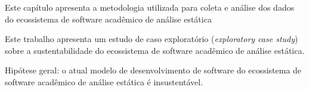 {Este capítulo apresenta a metodologia utilizada para coleta e análise dos
dados do ecossistema de software acadêmico de análise estática}
\label{metodologia}




Este trabalho apresenta um estudo de caso exploratório ({\it exploratory case
study}) \cite{stol2015holistic} sobre a sustentabilidade do ecossistema de
software acadêmico de análise estática.

Hipótese geral: o atual modelo de desenvolvimento de software do ecossistema de
software acadêmico de análise estática é insustentável.





